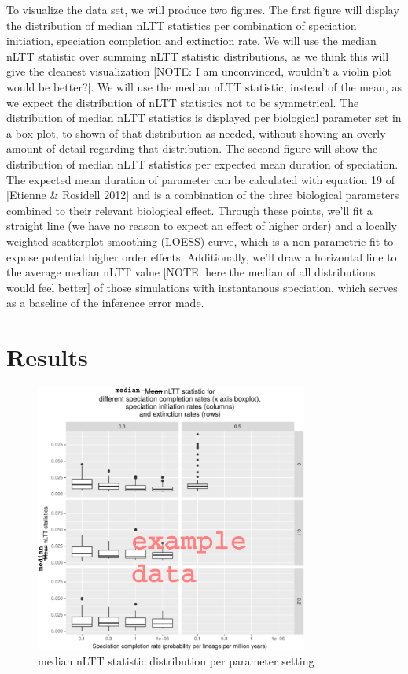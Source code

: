 \documentclass{article}
\begin{document}
To visualize the data set, we will produce two figures.
The first figure will display the distribution 
of median nLTT statistics per combination of speciation initiation, speciation
completion and extinction rate. We will use the median nLTT statistic over 
summing nLTT statistic distributions, as we think this will give the cleanest
visualization [NOTE: I am unconvinced, wouldn't a violin plot would
be better?]. We will use the median nLTT statistic, instead of the mean, as
we expect the distribution of nLTT statistics not to be symmetrical. The distribution
of median nLTT statistics is displayed per biological parameter set in a box-plot,
to shown of that distribution as needed, without showing an overly amount of detail
regarding that distribution. 
The second figure will show the distribution of median nLTT statistics per expected
mean duration of speciation. The expected mean duration of parameter can be calculated
with equation 19 of [Etienne \& Rosidell 2012] and is a combination of the three
biological parameters combined to their relevant biological effect. Through these
points, we'll fit a straight line (we have no reason to expect an effect of
higher order) and a locally weighted scatterplot smoothing (LOESS) 
curve, which is a non-parametric fit to expose potential higher order effects.
Additionally, we'll draw a horizontal line to the average median nLTT value 
[NOTE: here the median of all distributions would feel better] of
those simulations with instantanous speciation, which serves as a baseline of
the inference error made.

\section{Results}

\begin{figure}[!htbp]
  \includegraphics[width=0.8\textwidth]{nltt_stats_per_setup.png}
  \caption{
    median nLTT statistic distribution per parameter setting
  }
\end{figure}
\end{document}
